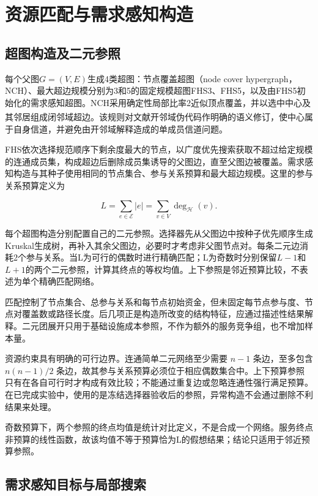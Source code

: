 \documentclass[UTF8,a4paper,twocolumn,fontset=none,zihao=5]{ctexart}
\newcommand{\upcite}[1]{\textsuperscript{\cite{#1}}}
\begin{document}
\section{资源匹配与需求感知构造}

\subsection{超图构造及二元参照}

每个父图$G=(V,E)$生成4类超图：节点覆盖超图（node cover hypergraph，NCH）、最大超边规模分别为3和5的固定规模超图FHS3、FHS5，以及由FHS5初始化的需求感知超图。NCH采用确定性局部比率2近似顶点覆盖，并以选中中心及其邻居组成闭邻域超边。该规则对文献\upcite{r10}开邻域伪代码作明确的语义修订，使中心属于自身信道，并避免由开邻域解释造成的单成员信道问题。


FHS依次选择规范顺序下剩余度最大的节点，以广度优先搜索获取不超过给定规模的连通成员集，构成超边后删除成员集诱导的父图边，直至父图边被覆盖。需求感知构造与其种子使用相同的节点集合、参与关系预算和最大超边规模。这里的参与关系预算定义为



\begin{equation}
L=\sum_{e\in\mathcal E}|e|=\sum_{v\in V}\deg_{\mathcal H}(v).
\label{eq:8}\end{equation}


每个超图构造分别配置自己的二元参照。选择器先从父图边中按种子优先顺序生成Kruskal生成树，再补入其余父图边，必要时才考虑非父图节点对。每条二元边消耗2个参与关系。当L为可行的偶数时进行精确匹配；L为奇数时分别保留$L-1$和$L+1$的两个二元参照，计算其终点的等权均值。上下参照是邻近预算比较，不表述为单个精确匹配网络。


匹配控制了节点集合、总参与关系和每节点初始资金，但未固定每节点参与度、节点对覆盖数或路径长度。后几项正是构造所改变的结构特征，应通过描述性结果解释。二元团展开只用于基础设施成本参照，不作为额外的服务竞争组，也不增加样本量。


资源约束具有明确的可行边界。连通简单二元网络至少需要 $n-1$ 条边，至多包含 $n(n-1)/2$ 条边，故其参与关系预算必须位于相应偶数集合中。上下预算参照只有在各自可行时才构成有效比较；不能通过重复边或忽略连通性强行满足预算。在已完成实验中，使用的是冻结选择器验收后的参照，异常构造不会通过删除不利结果来处理。


奇数预算下，两个参照的终点均值是统计对比定义，不是合成一个网络。服务终点非预算的线性函数，故该均值不等于预算恰为L的假想结果；结论只适用于邻近预算参照。


\subsection{需求感知目标与局部搜索}
\end{document}
